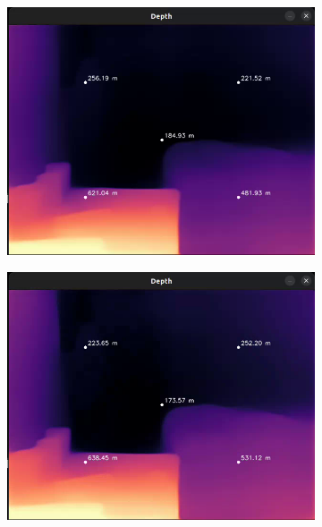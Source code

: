 \begin{figure}[H]
    \centering
    \begin{subfigure}[b]{0.45\textwidth}
        \includegraphics[width=\textwidth]{images/no_filter/frame_00000.png}
    \end{subfigure}
    \hfill
    \begin{subfigure}[b]{0.45\textwidth}
        \includegraphics[width=\textwidth]{images/no_filter/frame_00008.png}
    \end{subfigure}
    \vspace{0.5cm}
    \begin{subfigure}[b]{0.45\textwidth}

\end{subfigure}
\end{figure}
